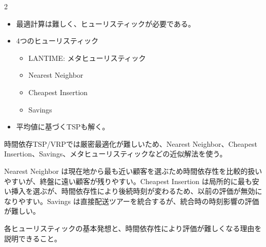

\vspace{1.5mm}

\begin{multicols}{2}

\footnotesize

\raggedcolumns


\begin{itemize}
\item 最適計算は難しく、ヒューリスティックが必要である。
\item 4つのヒューリスティック
\begin{itemize}
\item LANTIME: メタヒューリスティック
\item Nearest Neighbor
\item Cheapest Insertion
\item Savings
\end{itemize}
\item 平均値に基づくTSPも解く。
\end{itemize}

時間依存TSP/VRPでは厳密最適化が難しいため、Nearest Neighbor、Cheapest Insertion、Savings、メタヒューリスティックなどの近似解法を使う。\par

Nearest Neighbor は現在地から最も近い顧客を選ぶため時間依存性を比較的扱いやすいが、終盤に遠い顧客が残りやすい。Cheapest Insertion は局所的に最も安い挿入を選ぶが、時間依存性により後続時刻が変わるため、以前の評価が無効になりやすい。Savings は直接配送ツアーを統合するが、統合時の時刻影響の評価が難しい。\par

各ヒューリスティックの基本発想と、時間依存性により評価が難しくなる理由を説明できること。\par



\end{multicols}

